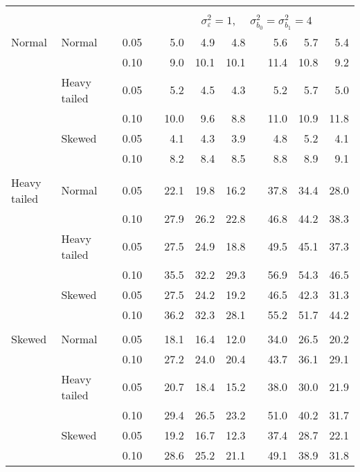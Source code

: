 \begin{table}[ht]
\begin{scriptsize}
\begin{tabular}{ll p{.1cm} c p{.1cm} rrr p{.1cm} rrr}
&&&&&&&&&&&\\
& && && \multicolumn{7}{c}{$\sigma_{\varepsilon}^2 = 1$, \ \ $\sigma_{b_0}^2 = \sigma_{b_1}^2 = 4$} \\ \cline{6-12}
\rowcolor{gray!20} Normal & Normal &  & 0.05 &  & 5.0 & 4.9 & 4.8 &  & 5.6 & 5.7 & 5.4 \\ 
\rowcolor{gray!20}    &  &  & 0.10 &  & 9.0 & 10.1 & 10.1 &  & 11.4 & 10.8 & 9.2 \\ 
\rowcolor{gray!20}    & Heavy tailed &  & 0.05 &  & 5.2 & 4.5 & 4.3 &  & 5.2 & 5.7 & 5.0 \\ 
\rowcolor{gray!20}    &  &  & 0.10 &  & 10.0 & 9.6 & 8.8 &  & 11.0 & 10.9 & 11.8 \\ 
\rowcolor{gray!20}    & Skewed &  & 0.05 &  & 4.1 & 4.3 & 3.9 &  & 4.8 & 5.2 & 4.1 \\ 
\rowcolor{gray!20}    &  &  & 0.10 &  & 8.2 & 8.4 & 8.5 &  & 8.8 & 8.9 & 9.1 \\ 
&&&&&&&&&&&\\
  Heavy tailed & Normal &  & 0.05 &  & 22.1 & 19.8 & 16.2 &  & 37.8 & 34.4 & 28.0 \\ 
   &  &  & 0.10 &  & 27.9 & 26.2 & 22.8 &  & 46.8 & 44.2 & 38.3 \\ 
   & Heavy tailed &  & 0.05 &  & 27.5 & 24.9 & 18.8 &  & 49.5 & 45.1 & 37.3 \\ 
   &  &  & 0.10 &  & 35.5 & 32.2 & 29.3 &  & 56.9 & 54.3 & 46.5 \\ 
   & Skewed &  & 0.05 &  & 27.5 & 24.2 & 19.2 &  & 46.5 & 42.3 & 31.3 \\ 
   &  &  & 0.10 &  & 36.2 & 32.3 & 28.1 &  & 55.2 & 51.7 & 44.2 \\ 
&&&&&&&&&&&\\
  Skewed & Normal &  & 0.05 &  & 18.1 & 16.4 & 12.0 &  & 34.0 & 26.5 & 20.2 \\ 
   &  &  & 0.10 &  & 27.2 & 24.0 & 20.4 &  & 43.7 & 36.1 & 29.1 \\ 
   & Heavy tailed &  & 0.05 &  & 20.7 & 18.4 & 15.2 &  & 38.0 & 30.0 & 21.9 \\ 
   &  &  & 0.10 &  & 29.4 & 26.5 & 23.2 &  & 51.0 & 40.2 & 31.7 \\ 
   & Skewed &  & 0.05 &  & 19.2 & 16.7 & 12.3 &  & 37.4 & 28.7 & 22.1 \\ 
   &  &  & 0.10 &  & 28.6 & 25.2 & 21.1 &  & 49.1 & 38.9 & 31.8 \\ 

\hline
\end{tabular}
\end{scriptsize}
\end{table}



